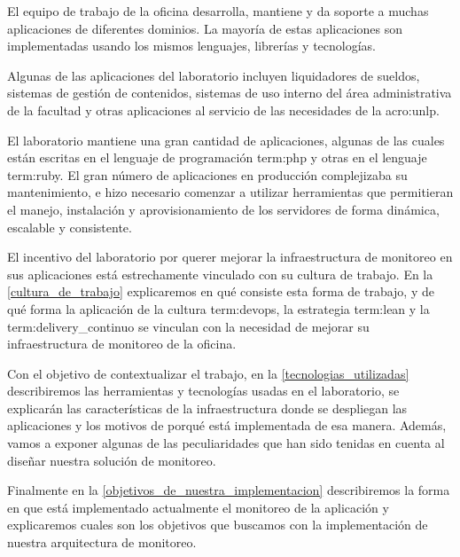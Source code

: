 El equipo de trabajo de la oficina desarrolla, mantiene y da soporte a muchas
aplicaciones de diferentes dominios. La mayoría de estas aplicaciones son
implementadas usando los mismos lenguajes, librerías y tecnologías.

Algunas de las aplicaciones del laboratorio incluyen liquidadores de sueldos,
sistemas de gestión de contenidos, sistemas de uso interno del área
administrativa de la facultad y otras aplicaciones al servicio de las
necesidades de la \gls{acro:unlp}.

El laboratorio mantiene una gran cantidad de aplicaciones, algunas de las
cuales están escritas en el lenguaje de programación \gls{term:php} y otras en
el lenguaje \gls{term:ruby}. El gran número de aplicaciones en producción
complejizaba su mantenimiento, e hizo necesario comenzar a utilizar
herramientas que permitieran el manejo, instalación y aprovisionamiento de los
servidores de forma dinámica, escalable y consistente.

El incentivo del laboratorio por querer mejorar la infraestructura de monitoreo
en sus aplicaciones está estrechamente vinculado con su cultura de trabajo. En
la \autoref{cultura_de_trabajo} explicaremos en qué consiste esta forma de
trabajo, y de qué forma la aplicación de la cultura \gls{term:devops}, la
estrategia \gls{term:lean} y la \gls{term:delivery_continuo} se vinculan con la
necesidad de mejorar su infraestructura de monitoreo de la oficina.

Con el objetivo de contextualizar el trabajo, en la
\autoref{tecnologias_utilizadas} describiremos las herramientas y tecnologías
usadas en el laboratorio, se explicarán las características de la
infraestructura donde se despliegan las aplicaciones y los motivos de porqué
está implementada de esa manera. Además, vamos a exponer algunas de las
peculiaridades que han sido tenidas en cuenta al diseñar nuestra solución de
monitoreo.

Finalmente en la \autoref{objetivos_de_nuestra_implementacion} describiremos la
forma en que está implementado actualmente el monitoreo de la aplicación y
explicaremos cuales son los objetivos que buscamos con la implementación de
nuestra arquitectura de monitoreo.
